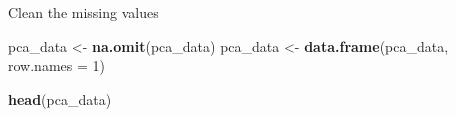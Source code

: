 \documentclass[]{article}
\newenvironment{Shaded}{\begin{snugshade}}{\end{snugshade}}
\newcommand{\CommentTok}[1]{\textcolor[rgb]{0.56,0.35,0.01}{\textit{#1}}}
\newcommand{\DataTypeTok}[1]{\textcolor[rgb]{0.13,0.29,0.53}{#1}}
\newcommand{\DecValTok}[1]{\textcolor[rgb]{0.00,0.00,0.81}{#1}}
\newcommand{\KeywordTok}[1]{\textcolor[rgb]{0.13,0.29,0.53}{\textbf{#1}}}
\newcommand{\NormalTok}[1]{#1}
\newcommand{\OperatorTok}[1]{\textcolor[rgb]{0.81,0.36,0.00}{\textbf{#1}}}
\newcommand{\StringTok}[1]{\textcolor[rgb]{0.31,0.60,0.02}{#1}}
\begin{document}
\begin{Shaded}
\end{Shaded}

Clean the missing values

\begin{Shaded}
\begin{Highlighting}[]
\NormalTok{pca_data <-}\StringTok{ }\KeywordTok{na.omit}\NormalTok{(pca_data)}
\NormalTok{pca_data <-}\StringTok{ }\KeywordTok{data.frame}\NormalTok{(pca_data, }\DataTypeTok{row.names =} \DecValTok{1}\NormalTok{)}
\end{Highlighting}
\end{Shaded}

\begin{Shaded}
\begin{Highlighting}[]
\KeywordTok{head}\NormalTok{(pca_data)}
\end{Highlighting}
\end{Shaded}
\end{document}
